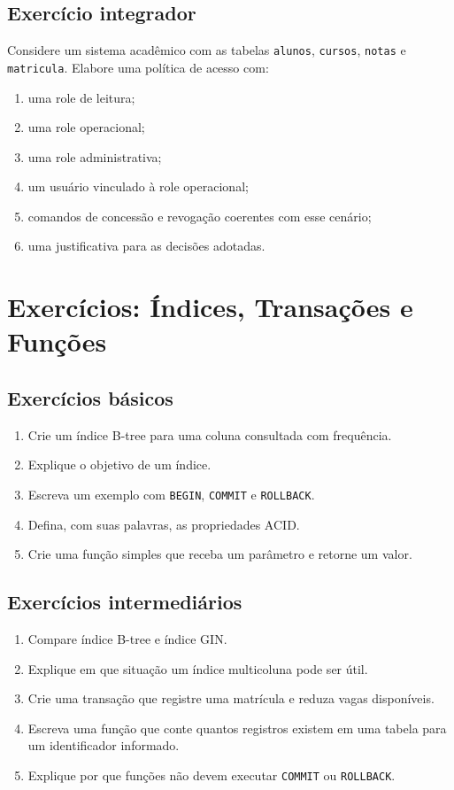 \subsection{Exercício integrador}

Considere um sistema acadêmico com as tabelas \texttt{alunos}, \texttt{cursos}, \texttt{notas} e \texttt{matricula}. Elabore uma política de acesso com:

\begin{enumerate}
    \item uma role de leitura;
    \item uma role operacional;
    \item uma role administrativa;
    \item um usuário vinculado à role operacional;
    \item comandos de concessão e revogação coerentes com esse cenário;
    \item uma justificativa para as decisões adotadas.
\end{enumerate}



\section{Exercícios: Índices, Transações e Funções}
\subsection{Exercícios básicos}

\begin{enumerate}
    \item Crie um índice B-tree para uma coluna consultada com frequência.
    \item Explique o objetivo de um índice.
    \item Escreva um exemplo com \texttt{BEGIN}, \texttt{COMMIT} e \texttt{ROLLBACK}.
    \item Defina, com suas palavras, as propriedades ACID.
    \item Crie uma função simples que receba um parâmetro e retorne um valor.
\end{enumerate}

\subsection{Exercícios intermediários}

\begin{enumerate}
    \item Compare índice B-tree e índice GIN.
    \item Explique em que situação um índice multicoluna pode ser útil.
    \item Crie uma transação que registre uma matrícula e reduza vagas disponíveis.
    \item Escreva uma função que conte quantos registros existem em uma tabela para um identificador informado.
    \item Explique por que funções não devem executar \texttt{COMMIT} ou \texttt{ROLLBACK}.
\end{enumerate}

